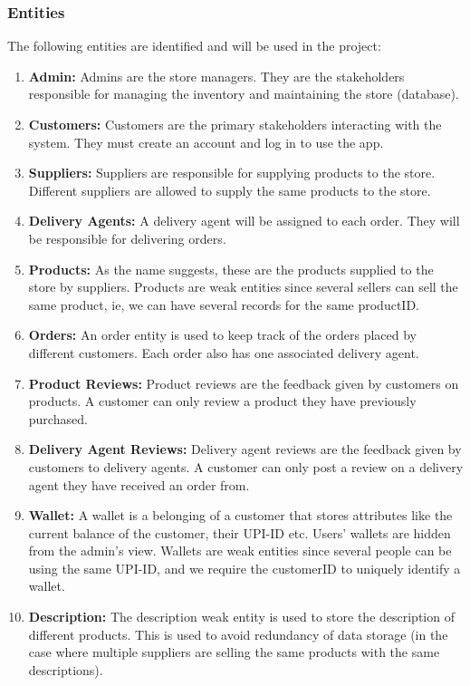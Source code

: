 \documentclass[12pt]{report}
\begin{document}
    \subsubsection*{Entities}
        The following entities are identified and will be used in the project:
        \begin{enumerate}
            \item \textbf{Admin:}
            Admins are the store managers.
            They are the stakeholders responsible for managing the inventory and maintaining the store (database).
            \item \textbf{Customers:}
            Customers are the primary stakeholders interacting with the system.
            They must create an account and log in to use the app.
            \item \textbf{Suppliers:}
            Suppliers are responsible for supplying products to the store.
            Different suppliers are allowed to supply the same products to the store.
            \item \textbf{Delivery Agents:}
            A delivery agent will be assigned to each order.
            They will be responsible for delivering orders.
            \item \textbf{Products:}
            As the name suggests, these are the products supplied to the store by suppliers.
            Products are weak entities since several sellers can sell the same product, ie, we can have several records for the same productID.
            \item \textbf{Orders:}
            An order entity is used to keep track of the orders placed by different customers.
            Each order also has one associated delivery agent.
            \item \textbf{Product Reviews:}
            Product reviews are the feedback given by customers on products.
            A customer can only review a product they have previously purchased.
            \item \textbf{Delivery Agent Reviews:}
            Delivery agent reviews are the feedback given by customers to delivery agents.
            A customer can only post a review on a delivery agent they have received an order from.
            \item \textbf{Wallet:}
            A wallet is a belonging of a customer that stores attributes like the current balance of the customer, their UPI-ID etc.
            Users' wallets are hidden from the admin's view. Wallets are weak entities since several people can be using the same UPI-ID,
            and we require the customerID to uniquely identify a wallet.
            \item \textbf{Description:}
            The description weak entity is used to store the description of different products.
            This is used to avoid redundancy of data storage (in the case where multiple suppliers are selling the same products with the same descriptions).
        \end{enumerate}
\end{document}
